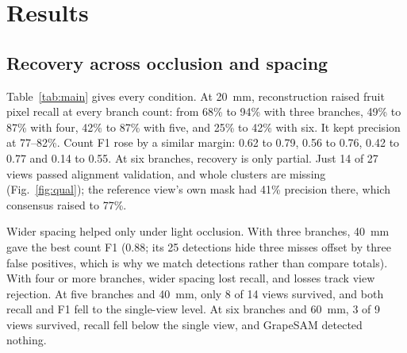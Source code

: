 \section{Results}
\subsection{Recovery across occlusion and spacing}
Table~\ref{tab:main} gives every condition. At 20~mm, reconstruction raised fruit pixel recall at every branch count: from 68\% to 94\% with three branches, 49\% to 87\% with four, 42\% to 87\% with five, and 25\% to 42\% with six. It kept precision at 77--82\%. Count F1 rose by a similar margin: 0.62 to 0.79, 0.56 to 0.76, 0.42 to 0.77 and 0.14 to 0.55. At six branches, recovery is only partial. Just 14 of 27 views passed alignment validation, and whole clusters are missing (Fig.~\ref{fig:qual}); the reference view's own mask had 41\% precision there, which consensus raised to 77\%.

Wider spacing helped only under light occlusion. With three branches, 40~mm gave the best count F1 (0.88; its 25 detections hide three misses offset by three false positives, which is why we match detections rather than compare totals). With four or more branches, wider spacing lost recall, and losses track view rejection. At five branches and 40~mm, only 8 of 14 views survived, and both recall and F1 fell to the single-view level. At six branches and 60~mm, 3 of 9 views survived, recall fell below the single view, and GrapeSAM detected nothing.

